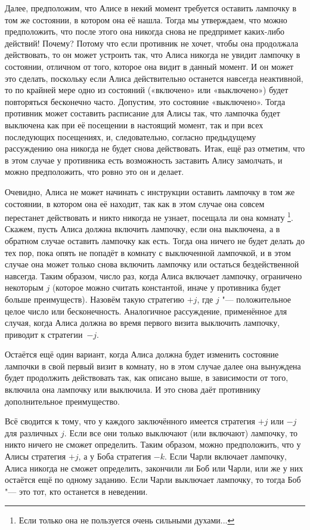 \documentclass[twoside]{book}
\begin{document}
Далее, предположим, что Алисе в некий момент требуется оставить лампочку в том же состоянии, в котором она её нашла.
Тогда мы утверждаем, что можно предположить, что после этого она никогда снова не предпримет каких-либо действий!
Почему?
Потому что если противник не хочет, чтобы она продолжала действовать, то он может устроить так, что Алиса никогда не увидит лампочку в состоянии, отличном от того, которое она видит в данный момент.
И он может это сделать, поскольку если Алиса действительно останется навсегда неактивной, то по крайней мере одно из состояний («включено» или «выключено») будет повторяться бесконечно часто.
Допустим, это состояние «выключено».
Тогда противник может составить расписание для Алисы так, что лампочка будет выключена как при её посещении в настоящий момент, так и при всех последующих посещениях, и, следовательно, согласно предыдущему рассуждению она никогда не будет снова действовать.
Итак, ещё раз отметим, что в этом случае у противника есть возможность заставить Алису замолчать, и можно предположить, что ровно это он и делает.

Очевидно, Алиса не может начинать с инструкции оставить лампочку в том же состоянии, в котором она её находит, так как в этом случае она совсем перестанет действовать и никто никогда не узнает, посещала ли она комнату%
\footnote{Если только она не пользуется очень сильными духами...}.
Скажем, пусть Алиса должна включить лампочку, если она выключена, а в обратном случае оставить лампочку как есть.
Тогда она ничего не будет делать до тех пор, пока опять не попадёт в комнату с выключенной лампочкой, и в этом случае она может только снова включить лампочку или остаться бездейственной навсегда.
Таким образом, число раз, когда Алиса включает лампочку, ограничено некоторым $j$ (которое можно считать константой, иначе у противника будет больше преимуществ).
Назовём такую стратегию $+j$, где $j$ "--- положительное целое число или бесконечность.
Аналогичное рассуждение, применённое для случая, когда Алиса должна во время первого визита выключить лампочку, приводит к стратегии~$-j$.

Остаётся ещё один вариант, когда Алиса должна будет изменить состояние лампочки в свой первый визит в комнату, но в этом случае далее она вынуждена будет продолжить действовать так, как описано выше, в зависимости от того, включила она лампочку или выключила.
И это снова даёт противнику дополнительное преимущество.

Всё сводится к тому, что у каждого заключённого имеется стратегия $+j$ или $-j$ для различных $j$.
Если все они только выключают (или включают) лампочку, то никто ничего не сможет определить.
Таким образом, можно предположить, что у Алисы стратегия $+j$, а у Боба стратегия $-k$.
Если Чарли включает лампочку, Алиса никогда не сможет определить, закончили ли Боб или Чарли, или же у них остаётся ещё по одному заданию.
Если Чарли выключает лампочку, то тогда Боб "--- это тот, кто останется в неведении.
\end{document}
